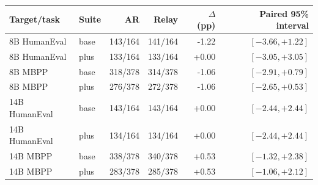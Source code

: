 \begin{tabular}{llrrrr}
\toprule
Target/task & Suite & AR & Relay & $\Delta$ (pp) & Paired 95\% interval \\
\midrule
8B HumanEval & base & 143/164 & 141/164 & -1.22 & $[-3.66, +1.22]$ \\
8B HumanEval & plus & 133/164 & 133/164 & +0.00 & $[-3.05, +3.05]$ \\
8B MBPP & base & 318/378 & 314/378 & -1.06 & $[-2.91, +0.79]$ \\
8B MBPP & plus & 276/378 & 272/378 & -1.06 & $[-2.65, +0.53]$ \\
14B HumanEval & base & 143/164 & 143/164 & +0.00 & $[-2.44, +2.44]$ \\
14B HumanEval & plus & 134/164 & 134/164 & +0.00 & $[-2.44, +2.44]$ \\
14B MBPP & base & 338/378 & 340/378 & +0.53 & $[-1.32, +2.38]$ \\
14B MBPP & plus & 283/378 & 285/378 & +0.53 & $[-1.06, +2.12]$ \\
\bottomrule
\end{tabular}
